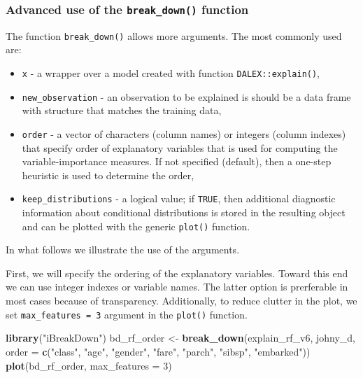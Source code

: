 \documentclass[12pt,]{krantz}
\newenvironment{Shaded}{\begin{snugshade}}{\end{snugshade}}
\newcommand{\DataTypeTok}[1]{\textcolor[rgb]{0.13,0.29,0.53}{#1}}
\newcommand{\DecValTok}[1]{\textcolor[rgb]{0.00,0.00,0.81}{#1}}
\newcommand{\KeywordTok}[1]{\textcolor[rgb]{0.13,0.29,0.53}{\textbf{#1}}}
\newcommand{\NormalTok}[1]{#1}
\newcommand{\StringTok}[1]{\textcolor[rgb]{0.31,0.60,0.02}{#1}}
\providecommand{\tightlist}{%
  \setlength{\itemsep}{0pt}\setlength{\parskip}{0pt}}
\begin{document}
\hypertarget{advanced-use-of-the-break_down-function}{%
\subsubsection{\texorpdfstring{Advanced use of the \texttt{break\_down()} function}{Advanced use of the break\_down() function}}\label{advanced-use-of-the-break_down-function}}

The function \texttt{break\_down()} allows more arguments. The most commonly used are:

\begin{itemize}
\tightlist
\item
  \texttt{x} - a wrapper over a model created with function \texttt{DALEX::explain()},
\item
  \texttt{new\_observation} - an observation to be explained is should be a data frame with structure that matches the training data,
\item
  \texttt{order} - a vector of characters (column names) or integers (column indexes) that specify order of explanatory variables that is used for computing the variable-importance measures. If not specified (default), then a one-step heuristic is used to determine the order,
\item
  \texttt{keep\_distributions} - a logical value; if \texttt{TRUE}, then additional diagnostic information about conditional distributions is stored in the resulting object and can be plotted with the generic \texttt{plot()} function.
\end{itemize}

In what follows we illustrate the use of the arguments.

First, we will specify the ordering of the explanatory variables. Toward this end we can use integer indexes or variable names. The latter option is prerferable in most cases because of transparency. Additionally, to reduce clutter in the plot, we set \texttt{max\_features\ =\ 3} argument in the \texttt{plot()} function.

\begin{Shaded}
\begin{Highlighting}[]
\KeywordTok{library}\NormalTok{(}\StringTok{"iBreakDown"}\NormalTok{)}
\NormalTok{bd_rf_order <-}\StringTok{ }\KeywordTok{break_down}\NormalTok{(explain_rf_v6,}
\NormalTok{                 johny_d,}
                 \DataTypeTok{order =} \KeywordTok{c}\NormalTok{(}\StringTok{"class"}\NormalTok{, }\StringTok{"age"}\NormalTok{, }\StringTok{"gender"}\NormalTok{, }\StringTok{"fare"}\NormalTok{, }\StringTok{"parch"}\NormalTok{, }\StringTok{"sibsp"}\NormalTok{, }\StringTok{"embarked"}\NormalTok{))}
\KeywordTok{plot}\NormalTok{(bd_rf_order, }\DataTypeTok{max_features =} \DecValTok{3}\NormalTok{) }
\end{Highlighting}
\end{Shaded}
\end{document}
